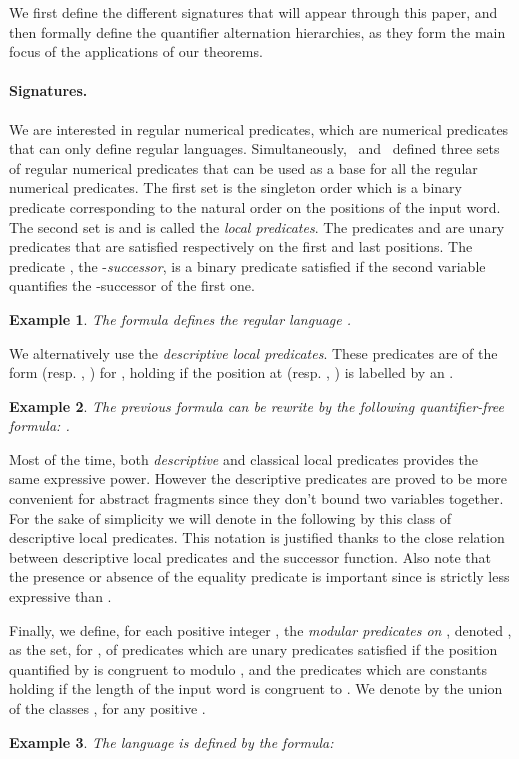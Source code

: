 \documentclass[submission,hidelink]{dmtcs-episciences}
\newtheorem{example}{Example}
\begin{document}
	We first define the different signatures that will appear through this paper,
	and then formally define the quantifier alternation hierarchies, as they form the main focus of the applications of our theorems.



\paragraph{Signatures.}
	We are interested in regular numerical predicates, which are numerical predicates that can only define regular languages.
	Simultaneously,~\cite{Straubing94} and~\cite{Pel92}  defined three sets of regular numerical predicates that can be used as a base for all the regular numerical predicates.
	The first set is the singleton order  which is a binary predicate corresponding to the natural order on the positions of the input word.
	The second set is  and is called the \emph{local predicates}.
	The predicates  and  are unary predicates that are satisfied respectively on the first and last positions.
	The predicate , the -\emph{successor}, is a binary predicate satisfied if the second variable quantifies the
	-successor of the first one.

	\begin{example}
		The formula 
		defines the regular language .
	\end{example}
	We alternatively use the \emph{descriptive local predicates}.
	These predicates are of the form
	 (resp. , ) for , holding if the position at  (resp. , ) is labelled by an .
	\begin{example}
		The previous formula can be rewrite by the following quantifier-free formula: .
	\end{example}
	Most of the time, both \emph{descriptive} and classical local predicates provides the same expressive power. However the descriptive
	predicates are proved to be more convenient for abstract fragments since they don't bound two variables together. For the sake of
	simplicity we will denote in the following by  this class of descriptive local predicates. This notation is justified thanks to
	the close relation between descriptive local predicates and the successor function.
	Also note that the presence or absence of the equality predicate is important since  is strictly less expressive than
	.

	Finally, we define, for each positive integer , the \emph{modular predicates on }, denoted , as the set, for , of predicates
 which are unary predicates satisfied if the position quantified by  is congruent to  modulo , and the predicates
	 which are constants holding if the length of the input word is congruent to .
	We denote by  the union of the classes , for any positive .
	\begin{example}
		The language  is defined by the formula:
		
	\end{example}
\end{document}
